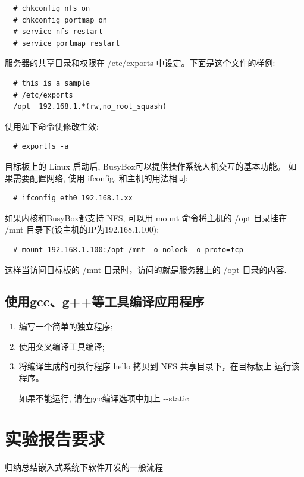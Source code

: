 \begin{boxedminipage}{.9\textwidth}
\begin{verbatim}
  # chkconfig nfs on
  # chkconfig portmap on
  # service nfs restart
  # service portmap restart
\end{verbatim}
\end{boxedminipage}

服务器的共享目录和权限在 /etc/exports 中设定。下面是这个文件的样例:

\begin{boxedminipage}{.9\textwidth}
\begin{verbatim}
  # this is a sample
  # /etc/exports
  /opt  192.168.1.*(rw,no_root_squash)
\end{verbatim}
\end{boxedminipage}

使用如下命令使修改生效:

\begin{boxedminipage}{.9\textwidth}
\begin{verbatim}
  # exportfs -a
\end{verbatim}
\end{boxedminipage}

    目标板上的 Linux 启动后, BusyBox可以提供操作系统人机交互的基本功能。
如果需要配置网络, 使用 ifconfig, 和主机的用法相同:

\begin{boxedminipage}{.9\textwidth}
\begin{verbatim}
  # ifconfig eth0 192.168.1.xx
\end{verbatim}
\end{boxedminipage}

如果内核和BusyBox都支持 NFS, 可以用 mount 命令将主机的 /opt 目录挂在 /mnt 
目录下(设主机的IP为192.168.1.100):

\begin{boxedminipage}{.9\textwidth}
\begin{verbatim}
  # mount 192.168.1.100:/opt /mnt -o nolock -o proto=tcp
\end{verbatim}
\end{boxedminipage}

 这样当访问目标板的 /mnt 目录时，访问的就是服务器上的 /opt 目录的内容.

\subsection{使用gcc、g++等工具编译应用程序}
\begin{enumerate}\itemsep=-3pt
  \item 编写一个简单的独立程序;
  \item 使用交叉编译工具编译;
  \item 将编译生成的可执行程序 hello 拷贝到 NFS 共享目录下，在目标板上
		运行该程序。

		如果不能运行, 请在gcc编译选项中加上 -{}-static
\end{enumerate}

\section{实验报告要求}
    归纳总结嵌入式系统下软件开发的一般流程
